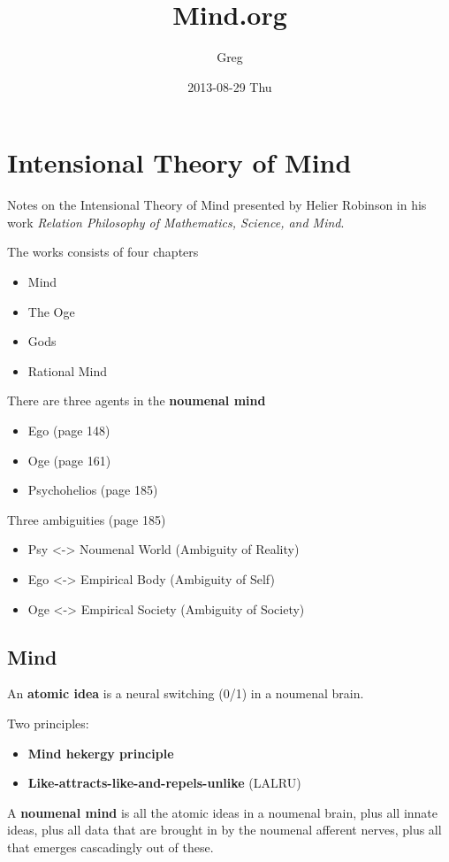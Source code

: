 \documentclass[11pt]{article}
\title{Mind.org}
\author{Greg}
\date{2013-08-29 Thu}
\begin{document}
\maketitle

\setcounter{tocdepth}{2}
\tableofcontents
\vspace*{1cm}

\section{Intensional Theory of Mind}
\label{sec-1}

Notes on the Intensional Theory of Mind presented by Helier Robinson in his 
work \emph{Relation Philosophy of Mathematics, Science, and Mind}.

The works consists of four chapters
\begin{itemize}
\item Mind
\item The Oge
\item Gods
\item Rational Mind
\end{itemize}
There are three agents in the \textbf{noumenal mind}
\begin{itemize}
\item Ego (page 148)
\item Oge (page 161)
\item Psychohelios (page 185)
\end{itemize}
Three ambiguities (page 185)
\begin{itemize}
\item Psy <-> Noumenal World (Ambiguity of Reality)
\item Ego <-> Empirical Body (Ambiguity of Self)
\item Oge <-> Empirical Society (Ambiguity of Society)
\end{itemize}
\subsection{Mind}
\label{sec-1.1}

An \textbf{atomic idea} is a neural switching (0/1) in a noumenal brain.

Two principles:
\begin{itemize}
\item \textbf{Mind hekergy principle}
\item \textbf{Like-attracts-like-and-repels-unlike} (LALRU)
\end{itemize}
A \textbf{noumenal mind} is all the atomic ideas in a noumenal brain,
plus all innate ideas, plus all data that are brought in by
the noumenal afferent nerves, plus all that emerges cascadingly
out of these.
\end{document}

